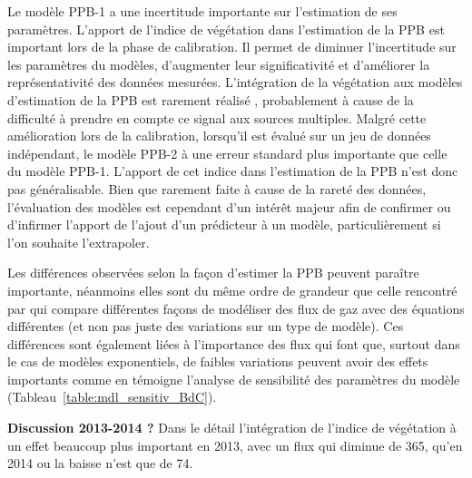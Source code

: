 Le modèle PPB-1 a une incertitude importante sur l'estimation de ses paramètres.
L'apport de l'indice de végétation dans l'estimation de la PPB est important lors de la phase de calibration.
Il permet de diminuer l'incertitude sur les paramètres du modèles, d'augmenter leur significativité et d'améliorer la représentativité des données mesurées.
L'intégration de la végétation aux modèles d'estimation de la PPB est rarement réalisé \citep{bortoluzzi2006,gorres2014}, probablement à cause de la difficulté à prendre en compte ce signal aux sources multiples.
Malgré cette amélioration lors de la calibration, lorsqu'il est évalué sur un jeu de données indépendant, le modèle PPB-2 à une erreur standard plus importante que celle du modèle PPB-1.
L'apport de cet indice dans l'estimation de la PPB n'est donc pas généralisable.
Bien que rarement faite à cause de la rareté des données, l'évaluation des modèles est cependant d'un intérêt majeur afin de confirmer ou d'infirmer l'apport de l'ajout d'un prédicteur à un modèle, particulièrement si l'on souhaite l'extrapoler.

Les différences observées selon la façon d'estimer la PPB peuvent paraître importante, néanmoins elles sont du même ordre de grandeur que celle rencontré par \citet{worrall2009} qui compare différentes façons de modéliser des flux de gaz avec des équations différentes (et non pas juste des variations sur un type de modèle).
Ces différences sont également liées à l'importance des flux qui font que, surtout dans le cas de modèles exponentiels, de faibles variations peuvent avoir des effets importants comme en témoigne l'analyse de sensibilité des paramètres du modèle (Tableau~\ref{table:mdl_sensitiv_BdC}).

\textbf{Discussion 2013-2014 ?}
Dans le détail l'intégration de l'indice de végétation à un effet beaucoup plus important en 2013, avec un flux qui diminue de \SI{365}{\gcma}, qu'en 2014 ou la baisse n'est que de \SI{74}{\gcma}.


